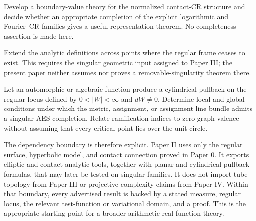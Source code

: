 \begin{problem}
Develop a boundary-value theory for the normalized contact-CR structure and decide
whether an appropriate completion of the explicit logarithmic and Fourier--CR
families gives a useful representation theorem.  No completeness assertion is made
here.
\end{problem}

\begin{problem}
Extend the analytic definitions across points where the regular frame ceases to
exist.  This requires the singular geometric input assigned to Paper III; the
present paper neither assumes nor proves a removable-singularity theorem there.
\end{problem}

\begin{problem}
Let an automorphic or algebraic function produce a cylindrical pullback on the
regular locus defined by \(0<|W|<\infty\) and \(dW\ne0\).  Determine local and
global conditions under which the metric, assignment, or assignment line bundle
admits a singular AES completion.  Relate ramification indices to zero-graph
valence without assuming that every critical point lies over the unit circle.
\end{problem}

The dependency boundary is therefore explicit.  Paper II uses only the regular
surface, hyperbolic model, and contact connection proved in Paper 0.  It exports
elliptic and contact analytic tools, together with planar and cylindrical pullback
formulas, that may later be tested on singular families.  It does not import tube
topology from Paper III or projective-complexity claims from Paper IV.  Within that
boundary, every advertised result is backed by a stated measure, regular locus, the
relevant test-function or variational domain, and a proof.  This is the appropriate
starting point for a broader arithmetic real function theory.
